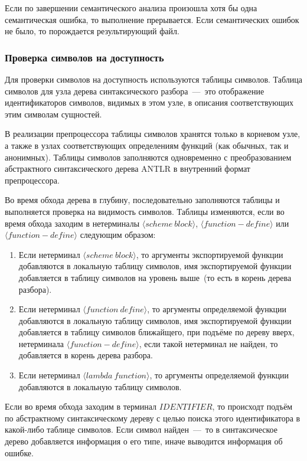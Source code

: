 \documentclass[12pt,a4paper,oneside]{extarticle}
\begin{document}
            Если по завершении семантического анализа произошла хотя бы одна семантическая ошибка, то выполнение прерывается. Если семантических ошибок не было, то порождается результирующий файл.

        \subsubsection{Проверка символов на доступность}
            Для проверки символов на доступность используются таблицы символов.
            Таблица символов для узла дерева синтаксического разбора~---~это отображение идентификаторов символов, видимых в этом узле, в описания соответствующих этим символам сущностей.

            В реализации препроцессора таблицы символов хранятся только в корневом узле, а также в узлах соответствующих определениям функций (как обычных, так и анонимных). Таблицы символов заполняются одновременно с преобразованием абстрактного синтаксического дерева ANTLR в внутренний формат препроцессора. 

            Во время обхода дерева в глубину, последовательно заполняются таблицы и выполняется проверка на видимость символов. Таблицы изменяются, если во время обхода заходим в нетерминалы $\langle scheme~block \rangle$, $\langle function-define \rangle$ или $\langle function-define \rangle$ следующим образом:
            \begin{enumerate}
                \item Если нетерминал $\langle scheme~block \rangle$, то аргументы экспортируемой функции добавляются в локальную таблицу символов, имя экспортируемой функции добавляется в таблицу символов на уровень выше~(то есть в корень дерева разбора).
                \item Если нетерминал $\langle function~define \rangle$, то аргументы определяемой функции добавляются в локальную таблицу символов, имя экспортируемой функции добавляется в таблицу символов ближайщего, при подъёме по дереву вверх, нетерминала $\langle function-define \rangle$, если такой нетерминал не найден, то добавляется в корень дерева разбора.
                \item Если нетерминал $\langle lambda~function \rangle$, то аргументы определяемой функции добавляются в локальную таблицу символов.
            \end{enumerate}

            Если во время обхода заходим в терминал $IDENTIFIER$, то происходт подъём по абстрактному синтаксическому дереву с целью поиска этого идентификатора в какой-либо таблице символов. Если символ найден~---~то в синтаксическое дерево добавляется информация о его типе, иначе выводится информация об ошибке.
\end{document}
